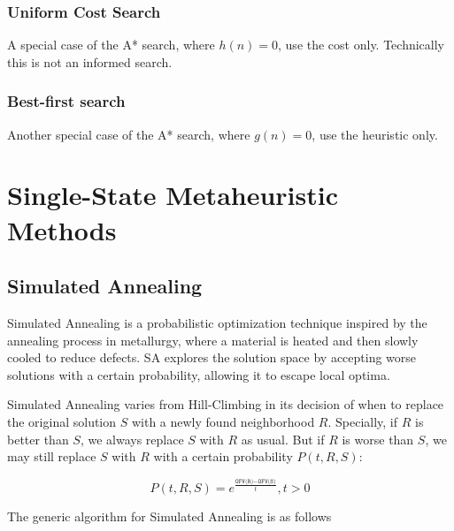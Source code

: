                 \subsubsection{Uniform Cost Search}
                    A special case of the A* search, where $h(n) = 0$, use the cost only. Technically this is not an informed search.

                \subsubsection{Best-first search}
                    Another special case of the A* search, where $g(n) = 0$, use the heuristic only.

        \section{Single-State Metaheuristic Methods}
            \subsection{Simulated Annealing}
                    Simulated Annealing is a probabilistic optimization technique inspired by the annealing process in metallurgy, where a material is heated and then slowly cooled to reduce defects. SA explores the solution space by accepting worse solutions with a certain probability, allowing it to escape local optima.

                    Simulated Annealing varies from Hill-Climbing in its decision of when to replace the original solution $S$ with a newly found neighborhood $R$. Specially, if $R$ is better than $S$, we always replace $S$ with $R$ as usual. But if $R$ is worse than $S$, we may still replace $S$ with $R$ with a certain probability $P(t, R, S)$:

                    \begin{equation}
                        P(t, R, S) = e^{\frac{\texttt{OFV(R)} - \texttt{OFV(S)}}{t}}, t > 0
                    \end{equation}

                    The generic algorithm for Simulated Annealing is as follows

